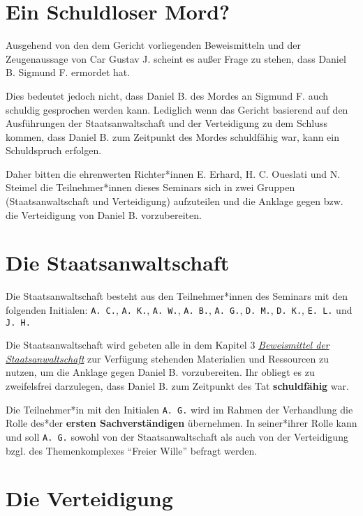 \documentclass[
  a4paper,
]{report}
\begin{document}
\hypertarget{blameless}{%
\section{Ein Schuldloser Mord?}\label{blameless}}

Ausgehend von den dem Gericht vorliegenden Beweismitteln und der Zeugenaussage von Car Gustav J. scheint es außer Frage zu stehen, dass Daniel B. Sigmund F. ermordet hat.

Dies bedeutet jedoch nicht, dass Daniel B. des Mordes an Sigmund F. auch schuldig gesprochen werden kann. Lediglich wenn das Gericht basierend auf den Ausführungen der Staatsanwaltschaft und der Verteidigung zu dem Schluss kommen, dass Daniel B. zum Zeitpunkt des Mordes schuldfähig war, kann ein Schuldspruch erfolgen.

Daher bitten die ehrenwerten Richter*innen E. Erhard, H. C. Oueslati und N. Steimel die Teilnehmer*innen dieses Seminars sich in zwei Gruppen (Staatsanwaltschaft und Verteidigung) aufzuteilen und die Anklage gegen bzw. die Verteidigung von Daniel B. vorzubereiten.

\hypertarget{prosecution}{%
\section{Die Staatsanwaltschaft}\label{prosecution}}

Die Staatsanwaltschaft besteht aus den Teilnehmer*innen des Seminars mit den folgenden Initialen: \texttt{A.\ C.}, \texttt{A.\ K.}, \texttt{A.\ W.}, \texttt{A.\ B.}, \texttt{A.\ G.}, \texttt{D.\ M.}, \texttt{D.\ K.}, \texttt{E.\ L.} und \texttt{J.\ H.}

Die Staatsanwaltschaft wird gebeten alle in dem Kapitel 3 \protect\hyperlink{prosecution-evidence}{\emph{Beweismittel der Staatsanwaltschaft}} zur Verfügung stehenden Materialien und Ressourcen zu nutzen, um die Anklage gegen Daniel B. vorzubereiten. Ihr obliegt es zu zweifelsfrei darzulegen, dass Daniel B. zum Zeitpunkt des Tat \textbf{schuldfähig} war.

Die Teilnehmer*in mit den Initialen \texttt{A.\ G.} wird im Rahmen der Verhandlung die Rolle des*der \textbf{ersten Sachverständigen} übernehmen. In seiner*ihrer Rolle kann und soll \texttt{A.\ G.} sowohl von der Staatsanwaltschaft als auch von der Verteidigung bzgl. des Themenkomplexes ``Freier Wille'' befragt werden.

\hypertarget{defence}{%
\section{Die Verteidigung}\label{defence}}
\end{document}
